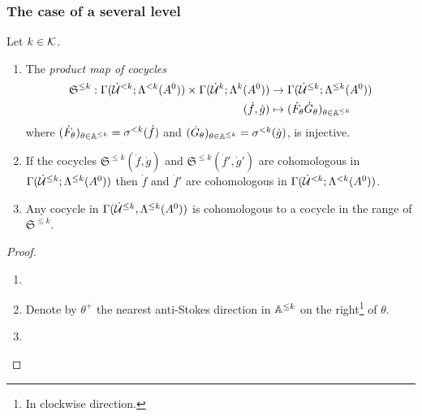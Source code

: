 \subsubsection{The case of a several level}
\begin{comment}
  \cite[II.3.3]{Loday1994}
\end{comment}
\begin{lem}
  Let $k\in\mathcal{K}$.
  \begin{enumerate}
    \item The \emph{product map of cocycles}
      \begin{align*}
        \mathfrak{S}^{\leq k}:
        \Gamma(\dot{\mathcal{U}}^{<k};\Lambda^{<k}(A^0))
        \times
        \Gamma(\dot{\mathcal{U}}^{k};\Lambda^{k}(A^0))
        &\to
        \Gamma(\dot{\mathcal{U}}^{\leq k};\Lambda^{\leq k}(A^0))
      \\(\dot f, \dot g)
        &\mapsto
        (\dot F_\theta\dot G_\theta)_{\theta\in\mathbb{A}^{\leq k}}
      \end{align*}
      where $(\dot F_\theta)_{\theta\in\mathbb{A}^{\leq k}}=\sigma^{<k}(\dot f)$ and
      $(\dot G_\theta)_{\theta\in\mathbb{A}^{\leq k}}=\sigma^{<k}(\dot g)$, is
      injective.
    \item If the cocycles $\mathfrak{S}^{\leq k}(\dot f,\dot g)$ and
      $\mathfrak{S}^{\leq k}(\dot f',\dot g')$ are cohomologous in
      $\Gamma(\dot{\mathcal{U}}^{\leq k};\Lambda^{\leq k}(A^0))$
      then $\dot f$ and $\dot f'$ are cohomologous in
      $\Gamma(\dot{\mathcal{U}}^{<k};\Lambda^{<k}(A^0))$.
    \item Any cocycle in $\Gamma(\dot{\mathcal{U}}^{\leq k},\Lambda^{\leq k}(A^0))$ is
      cohomologous to a cocycle in the range of $\mathfrak{S}^{\leq k}$.
  \end{enumerate}
\end{lem}
\begin{proof}
  \begin{comment}
    See \cite[Lem.II.3.3]{Loday1994}.
  \end{comment}
  \begin{enumerate}
    \item \TODO{}
    \item
      Denote by $\theta^+$ the nearest anti-Stokes direction in $\mathbb{A}^{\leq k}$
      on the right\footnote{In clockwise direction.} of $\theta$.
      \TODO{}
    \item \TODO{}
  \end{enumerate}
  \TODO{}
\end{proof}
